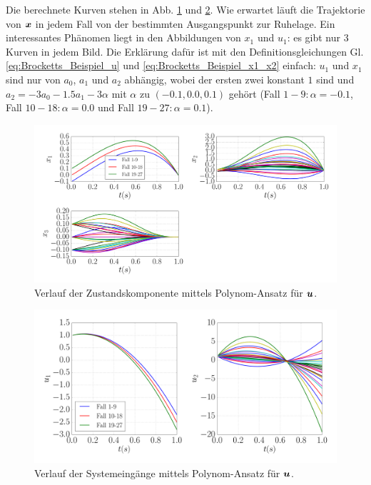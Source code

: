 Die berechnete Kurven stehen in Abb. \ref{fig:Brockett_e2_Asy_u(t)_dx_01_x} und \ref{fig:Brockett_e2_Asy_u(t)_dx_01_u}. Wie erwartet läuft die Trajektorie von $\boldsymbol x$ in jedem Fall von der bestimmten Ausgangspunkt zur Ruhelage. Ein interessantes Phänomen liegt in den Abbildungen von $x_{1}$ und $u_{1}$: es gibt nur $3$ Kurven in jedem Bild. Die Erklärung dafür ist mit den Definitionsgleichungen Gl. \eqref{eq:Brocketts_Beispiel_u} und \eqref{eq:Brocketts_Beispiel_x1_x2} einfach: $u_{1}$ und $x_{1}$ sind nur von $a_{0}$, $a_{1}$ und $a_{2}$ abhängig, wobei der ersten zwei konstant $1$ sind und $a_{2} =-3a_{0}-1.5a_{1}-3\alpha$ mit $\alpha$ zu $(-0.1,0.0,0.1)$ gehört (Fall $1-9:\alpha=-0.1$, Fall $10-18:\alpha=0.0$ und Fall $19-27:\alpha=0.1$). 
\begin{figure}[!h]
	\centering
	\includegraphics[width=\linewidth]{bild/30_32/Brockett_e2_Asy_u(t)_dx_01_x.pdf}%
	\caption{Verlauf der Zustandskomponente mittels Polynom-Ansatz für $\boldsymbol u$.}
	\label{fig:Brockett_e2_Asy_u(t)_dx_01_x}
\end{figure}

\begin{figure}[!h]
	\centering
	\includegraphics[width=0.8\linewidth]{bild/30_32/Brockett_e2_Asy_u(t)_dx_01_u_old.pdf}%
	\caption{Verlauf der Systemeingänge mittels Polynom-Ansatz für $\boldsymbol u$.}
	\label{fig:Brockett_e2_Asy_u(t)_dx_01_u}
\end{figure}

